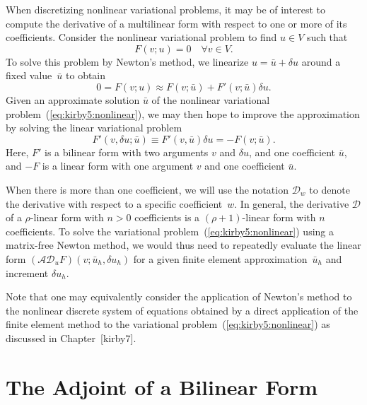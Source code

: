 When discretizing nonlinear variational problems, it may be of
interest to compute the derivative of a multilinear form with respect
to one or more of its coefficients. Consider the nonlinear variational
problem to find $u \in V$ such that
\begin{equation} \label{eq:kirby5:nonlinear}
  F(v; u) = 0 \quad \forall v \in V.
\end{equation}
To solve this problem by Newton's method, we linearize $u = \bar{u} +
\delta u$ around a fixed value~$\bar{u}$ to
obtain
\begin{displaymath}
  0 = F(v; u) \approx F(v; \bar{u}) + F'(v; \bar{u}) \delta u.
\end{displaymath}
Given an approximate solution $\bar{u}$ of the nonlinear variational
problem~(\ref{eq:kirby5:nonlinear}), we may then hope to improve the
approximation by solving the linear variational problem
\begin{displaymath}
  F'(v, \delta u; \bar{u}) \equiv F'(v, \bar{u}) \delta u = -F(v; \bar{u}).
\end{displaymath}
Here, $F'$ is a bilinear form with two arguments $v$ and $\delta u$,
and one coefficient $\bar{u}$, and $-F$ is a linear form with one
argument $v$ and one coefficient $\bar{u}$.

When there is more than one coefficient, we will use the notation
$\mathcal{D}_w$ to denote the derivative with respect to a specific
coefficient~$w$. In general, the derivative $\mathcal{D}$ of a
$\rho$-linear form with $n > 0$ coefficients is a $(\rho+1)$-linear
form with $n$ coefficients. To solve the variational
problem~(\ref{eq:kirby5:nonlinear}) using a matrix-free Newton method,
we would thus need to repeatedly evaluate the linear form
$(\mathcal{A}\mathcal{D}_u F) (v; \bar{u}_h, \delta u_h)$ for a given
finite element approximation~$\bar{u}_h$ and increment $\delta u_h$.

Note that one may equivalently consider the application of Newton's
method to the nonlinear discrete system of equations obtained by a
direct application of the finite element method to the variational
problem~(\ref{eq:kirby5:nonlinear}) as discussed in Chapter~[kirby7].

\section{The Adjoint of a Bilinear Form}

